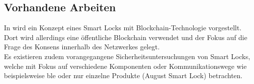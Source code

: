     \subsection{Vorhandene Arbeiten}
    \label{sec:problem_relatedWork}
        In \cite{Han2017} wird ein Konzept eines Smart Locks mit Blockchain-Technologie vorgestellt. 
        Dort wird allerdings eine öffentliche Blockchain verwendet und der Fokus auf die Frage des Konsens innerhalb des Netzwerkes gelegt. \\
        Es existieren zudem vorangegangene Sicherheitsuntersuchungen von Smart Locks, welche mit Fokus auf verschiedene Komponenten oder Kommunikationswege wie beispielsweise \gls{ble}\cite{Rose2016} oder nur einzelne Produkte (August Smart Lock\cite{Fuller2017,Ho2016,Ye2017}) betrachten.
